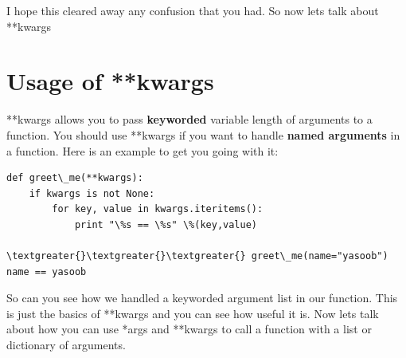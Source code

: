 \documentclass[a4paper,12pt,oneside]{sphinxmanual}
\begin{document}
I hope this cleared away any confusion that you had. So now lets talk
about **kwargs


\section{Usage of **kwargs}
\label{args_and_kwargs:usage-of-kwargs}
**kwargs allows you to pass \textbf{keyworded} variable length of arguments
to a function. You should use **kwargs if you want to handle \textbf{named
arguments} in a function. Here is an example to get you going with it:
\begin{Verbatim}[commandchars=\\\{\}]
def greet\_me(**kwargs):
    if kwargs is not None:
        for key, value in kwargs.iteritems():
            print "\%s == \%s" \%(key,value)

\textgreater{}\textgreater{}\textgreater{} greet\_me(name="yasoob")
name == yasoob
\end{Verbatim}

So can you see how we handled a keyworded argument list in our function.
This is just the basics of **kwargs and you can see how useful it is.
Now lets talk about how you can use *args and **kwargs to call a
function with a list or dictionary of arguments.
\end{document}
